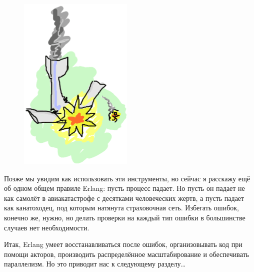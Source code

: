 \documentclass[a4paper,12pt]{report}
\begin{document}
\begin{figure}
    \includegraphics[width=1\linewidth]{letitcrash.png}
\end{figure}
Позже мы увидим как использовать эти инструменты, но сейчас я расскажу ещё об одном общем правиле Erlang: пусть процесс падает. Но пусть он падает не как самолёт в авиакатастрофе с десятками человеческих жертв, а пусть падает как канатоходец, под которым натянута страховочная сеть. Избегать ошибок, конечно же, нужно, но делать проверки на каждый тип ошибки в большинстве случаев нет необходимости.

Итак, Erlang умеет восстанавливаться после ошибок, организовывать код при помощи акторов, производить распределённое масштабирование и обеспечивать параллелизм. Но это приводит нас к следующему разделу\ldots
\end{document}
